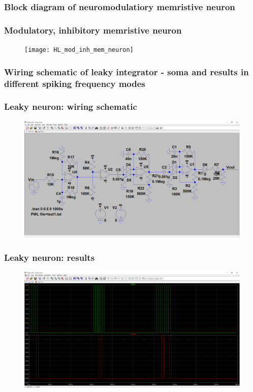 \documentclass[12pt, aspectratio=169]{beamer}
\begin{document}
\subsubsection{Block diagram of neuromodulatiory memristive neuron}

\begin{frame}
  \frametitle{Modulatory, inhibitory memristive neuron}
  \begin{figure}
    \texttt{[image: HL\_mod\_inh\_mem\_neuron]}
  \end{figure}
\end{frame}

\subsubsection{Wiring schematic of leaky integrator - soma and results in different spiking frequency modes}

\begin{frame}
\frametitle{Leaky neuron: wiring schematic}
\begin{figure}
\includegraphics[width=0.85\linewidth]{Leak_sch}
\end{figure}
\end{frame}


\begin{frame}
\frametitle{Leaky neuron: results}
\begin{figure}
\includegraphics[width=0.85\linewidth]{Leak_test}
\end{figure}
\end{frame}
\end{document}
